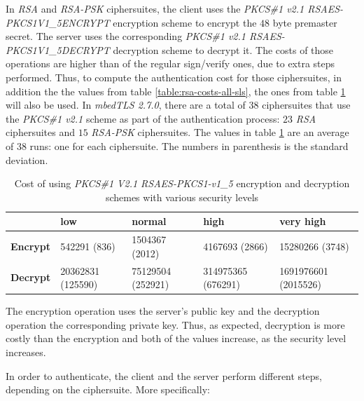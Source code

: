 \documentclass{llncs}
\begin{document}
In \textit{RSA} and \textit{RSA-PSK} ciphersuites, the client uses the \textit{PKCS\#1 v2.1 RSAES-PKCS1\-V1\_5\-ENCRYPT}\cite{RFC3447}
encryption scheme to encrypt  the $48$ byte premaster secret. The server uses the corresponding \textit{PKCS\#1 v2.1 RSAES-PKCS1\-V1\_5\-DECRYPT}\cite{RFC3447}
decryption scheme to decrypt it. The costs of those operations are higher than of the regular sign/verify ones, due to extra steps performed.
Thus, to compute the authentication cost for those ciphersuites, in addition the the values from table \ref{table:rsa-costs-all-sls}, the ones
from table \ref{table:pkcs-cost} will also be used. In \textit{mbedTLS 2.7.0}, there are a total of
$38$ ciphersuites that use the \textit{PKCS\#1 v2.1} scheme as part of the authentication process: $23$
\textit{RSA} ciphersuites and $15$ \textit{RSA-PSK} ciphersuites. The values in table \ref{table:pkcs-cost} are an average
of $38$ runs: one for each ciphersuite. The numbers in parenthesis is the standard deviation.

\begin{table}[]
  \begin{tabular}{|l|l|l|l|l|}
  \hline
                   & \textbf{low}      & \textbf{normal}   & \textbf{high}      & \textbf{very high}   \\ \hline
  \textbf{Encrypt} & 542291 (836)      & 1504367 (2012)    & 4167693 (2866)     & 15280266 (3748)      \\ \hline
  \textbf{Decrypt} & 20362831 (125590) & 75129504 (252921) & 314975365 (676291) & 1691976601 (2015526) \\ \hline
  \end{tabular}
  \centering \caption{\label{table:pkcs-cost} Cost of using \textit{PKCS\#1 V2.1 RSAES-PKCS1-v1\_5} encryption and decryption schemes with various security levels}
  \end{table}

The encryption operation uses the server's public key and the decryption operation the corresponding private key. Thus, as expected,
decryption is more costly than the encryption and both of the values increase, as the security level increases.

In order to authenticate, the client and the server perform different steps, depending on the ciphersuite. More specifically:
\end{document}
